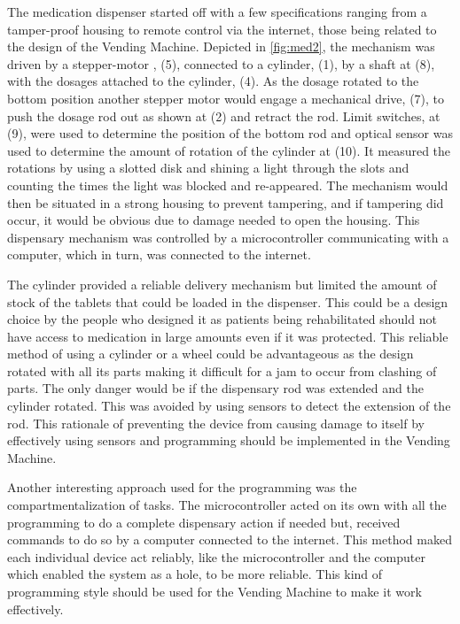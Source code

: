 \documentclass[a4paper,11pt]{article}
\newcommand*{\halfref}[1]{\hyperref[{#1}]{\autoref*{#1}}}
\numberwithin{figure}{section}
\numberwithin{table}{section}
\begin{document}
The medication dispenser started off with a few specifications ranging from a tamper-proof housing to remote control via the internet, those being related to the design of the Vending Machine. Depicted in  \halfref{fig:med2}, the mechanism was driven by a stepper-motor , (5), connected to a cylinder, (1), by a shaft at (8), with the dosages attached to the cylinder, (4). As the dosage rotated to the bottom position another stepper motor would engage a mechanical drive, (7), to push the dosage rod out as shown at (2) and retract the rod. Limit switches, at (9), were used to determine the position of the bottom rod and optical sensor was used to determine the amount of rotation of the cylinder at (10). It measured the rotations by using a slotted disk and shining a light through the slots and counting the times the light was blocked and re-appeared. The mechanism would then be situated in a strong housing to prevent tampering, and if tampering did occur, it would be obvious due to damage needed to open the housing. This dispensary mechanism was controlled by a microcontroller communicating with a computer, which in turn, was connected to the internet. 

The cylinder provided a reliable delivery mechanism but limited the amount of stock of the tablets that could be loaded in the dispenser. This could be a design choice by the people who designed it as patients being rehabilitated should not have access to medication in large amounts even if it was protected. This reliable method of using a cylinder or a wheel could be advantageous as the design rotated with all its parts making it difficult for a jam to occur from clashing of parts. The only danger would be if the dispensary rod was extended and the cylinder rotated. This was avoided by using sensors to detect the extension of the rod. This rationale of preventing the device from causing damage to itself by effectively using sensors and programming should be implemented in the Vending Machine.

Another interesting approach used for the programming was the compartmentalization of tasks. The microcontroller acted on its own with all the programming to do a complete dispensary action if needed but, received commands to do so by a computer connected to the internet. This method maked each individual device act reliably, like the microcontroller and the computer which enabled the system as a hole, to be more reliable. This kind of programming style should be used for the Vending Machine to make it work effectively.
\end{document}

